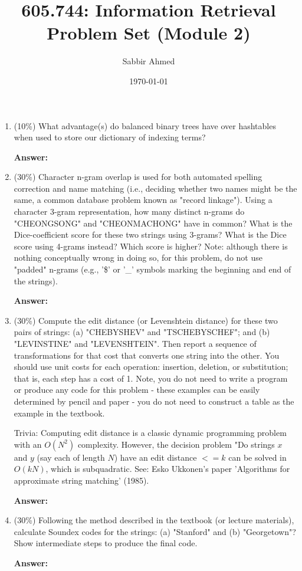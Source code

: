 \documentclass[11pt]{article}
\title{605.744: Information Retrieval \\ Problem Set (Module 2)}
\author{Sabbir Ahmed}
\date{\today}
\begin{document}
\maketitle	

    \begin{enumerate}

        \item (10\%) What advantage(s) do balanced binary trees have over hashtables when used to store our dictionary of indexing terms?

        \textbf{Answer:}

        \item (30\%) Character n-gram overlap is used for both automated spelling correction and name matching (i.e., deciding whether two names might be the same, a common database problem known as "record linkage"). Using a character 3-gram representation, how many distinct n-grams do "CHEONGSONG" and "CHEONMACHONG" have in common? What is the Dice-coefficient score for these two strings using 3-grams? What is the Dice score using 4-grams instead? Which score is higher? Note: although there is nothing conceptually wrong in doing so, for this problem, do not use "padded" n-grams (e.g., '\$' or '\_' symbols marking the beginning and end of the strings).

        \textbf{Answer:}

        \item (30\%) Compute the edit distance (or Levenshtein distance) for these two pairs of strings: (a) "CHEBYSHEV" and "TSCHEBYSCHEF"; and (b) "LEVINSTINE" and "LEVENSHTEIN". Then report a sequence of transformations for that cost that converts one string into the other. You should use unit costs for each operation: insertion, deletion, or substitution; that is, each step has a cost of 1. Note, you do not need to write a program or produce any code for this problem - these examples can be easily determined by pencil and paper - you do not need to construct a table as the example in the textbook.

        Trivia: Computing edit distance is a classic dynamic programming problem with an $O(N^2)$ complexity. However, the decision problem "Do strings $x$ and $y$ (say each of length $N$) have an edit distance $<= k$ can be solved in $O(kN)$, which is subquadratic. See: Esko Ukkonen's paper 'Algorithms for approximate string matching' (1985).

        \textbf{Answer:}

        \item (30\%) Following the method described in the textbook (or lecture materials), calculate Soundex codes for the strings: (a) "Stanford" and (b) "Georgetown"? Show intermediate steps to produce the final code.

        \textbf{Answer:}

    \end{enumerate}
\end{document}
